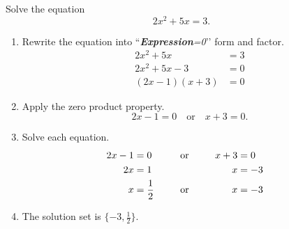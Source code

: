 	\begin{multicols}{2}
		\begin{example}
			Solve the equation
			\[2x^2+5x=3.\]
		\end{example}
		\begin{solution}
			\begin{enumerate}[label={\textbf{\textup{Step \arabic*.}}~}]
				\item Rewrite the equation into ``\textit{\textbf{Expression}=0}\rq\rq{} form and factor.
				      \[
						  \begin{split}
						      2x^2+5x&=3\\
						      2x^2+5x-3&=0\\
						      (2x-1)(x+3)&=0
					      \end{split}
				      \]
				\item Apply the zero product property.
				      \[2x-1=0\quad\text{or}\quad x+3=0.\]
				\item Solve each equation.
				      \begin{alignat*}{3}
					      2x-1 & =0       &  & \ctc{or} & x+3 & =0  \\
					      2x   & =1       &  &          & x   & =-3 \\
					      x    & =\frac12 &  & \ctc{or} & x   & =-3
				      \end{alignat*}
				\item The solution set is $\{-3, \frac12\}$.
			\end{enumerate}
		\end{solution}

		\columnbreak


\end{multicols}
